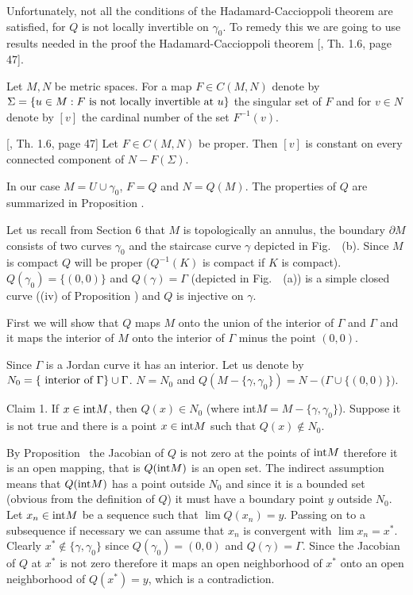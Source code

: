  Unfortunately, not all the
conditions of the Hadamard-Caccioppoli theorem are satisfied, for
$Q$ is not locally invertible on $\gamma _0$.  To remedy this we
are going to use results needed in the proof the
Hadamard-Caccioppoli theorem [{\AmProdi}, Th. 1.6, page 47].

Let $M,N$ be metric spaces. For a map $F\in C(M,N)$ denote by
$\Sigma=\{u\in M: F \hbox{\ is not locally invertible at\ }u\}$
the singular set of $F$ and for $v\in N$ denote by $[v]$ the
cardinal number of the set $F^{-1}(v)$.

 [{\AmProdi}, Th. 1.6, page 47]
Let  $F\in C(M,N)$
be proper.  Then $[v]$ is  constant on every connected component
of $N-F(\Sigma)$.
\endproclaim

In our case $M=U\cup \gamma _0$, $F=Q$ and $N=Q(M)$. The
properties of $Q$ are summarized in Proposition \injectgamma.

Let us recall from Section 6 that $M$ is topologically an annulus,
the boundary $\partial M$ consists of two curves $\gamma _0$ and
the staircase curve $\gamma$ depicted in Fig.\ \figten\ (b). Since $M$ is
compact $Q$ will be proper ($Q^{-1}(K)$ is compact if $K$ is
compact). $Q(\gamma _0)=\{(0,0)\}$ and $Q(\gamma)=\Gamma $
(depicted in Fig.\ \figten\ (a)) is a simple closed curve ((iv) of
Proposition \injectgamma) and $Q$ is injective on $\gamma$.

First we will show that $Q$ maps $M$ onto the union of the
interior of $\Gamma$ and $\Gamma$ and it maps the interior of $M$
onto the interior of $\Gamma$ minus the point $(0,0)$.

Since $\Gamma$ is a Jordan curve it has an interior. Let us denote
by $N_0=\{\hbox{ interior of\ } \Gamma\}\cup \Gamma$.
%
 $N=N_0$ and
$Q(M-\{\gamma, \gamma _0\})=N-\big(\Gamma \cup\{(0,0)\}\big).$
\endproclaim

 Claim 1. If $x\in \hbox {int}M$, then $Q(x)\in N_0$
(where int$M=M-\{\gamma,\gamma_0\}$). Suppose it is not true and
there is a point $x\in \hbox {int}M$ such that $Q(x)\notin N_0$.

By Proposition \injectgamma\ the Jacobian of $Q$  is not zero at the points
of $\hbox{int}M$ therefore it is an open mapping, that is
$Q(\hbox{int}M)$ is an open set. The indirect assumption means
that $Q(\hbox{int}M)$ has a point outside $N_0$ and since it is a
bounded set (obvious from the definition of $Q$) it must have a
boundary point $y$ outside $N_0$. Let $x_n\in \hbox {int}M$ be a
sequence such that $\lim Q(x_n)=y$. Passing on to a subsequence if
necessary we can assume that $x_n$ is convergent with $\lim
x_n=x^*$. Clearly $x^*\notin \{\gamma, \gamma _0\}$ since
$Q(\gamma _0)=(0,0)$ and $Q(\gamma )=\Gamma $. Since the Jacobian
of $Q$ at $x^*$ is not zero therefore it maps an open neighborhood
of $x^*$ onto an open neighborhood of $Q(x^*)=y$, which is a
contradiction.

